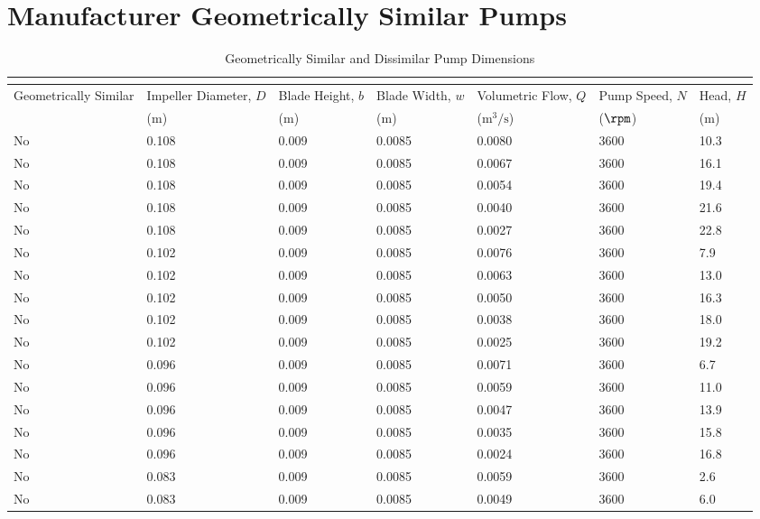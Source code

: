 \section{Manufacturer Geometrically Similar Pumps}
\begin{longtable}{p{}C{0.10\textwidth}C{0.10\textwidth}C{0.10\textwidth}C{0.10\textwidth}C{0.10\textwidth}C{0.10\textwidth}}
    \caption{Geometrically Similar and Dissimilar Pump Dimensions} \\
    \label{tab:geometrically_similar_pumps} \\[-8ex]
    \toprule
    Geometrically Similar & Impeller Diameter, $D$ & Blade Height, $b$ & Blade Width, $w$ & Volumetric Flow, $Q$ & Pump Speed, $N$ & Head, $H$ \\
    & ($\unit{\meter}$) & ($\unit{\meter}$) & ($\unit{\meter}$) & ($\unit{\meter\cubed\per\second}$) & ($\unit{\rpm}$) & ($\unit{\meter}$) \\
    \midrule
    No & 0.108 & 0.009 & 0.0085 & 0.0080 & 3600 & 10.3 \\
    No & 0.108 & 0.009 & 0.0085 & 0.0067 & 3600 & 16.1 \\
    No & 0.108 & 0.009 & 0.0085 & 0.0054 & 3600 & 19.4 \\
    No & 0.108 & 0.009 & 0.0085 & 0.0040 & 3600 & 21.6 \\
    No & 0.108 & 0.009 & 0.0085 & 0.0027 & 3600 & 22.8 \\
    No & 0.102 & 0.009 & 0.0085 & 0.0076 & 3600 & 7.9 \\
    No & 0.102 & 0.009 & 0.0085 & 0.0063 & 3600 & 13.0 \\
    No & 0.102 & 0.009 & 0.0085 & 0.0050 & 3600 & 16.3 \\
    No & 0.102 & 0.009 & 0.0085 & 0.0038 & 3600 & 18.0 \\
    No & 0.102 & 0.009 & 0.0085 & 0.0025 & 3600 & 19.2 \\
    No & 0.096 & 0.009 & 0.0085 & 0.0071 & 3600 & 6.7 \\
    No & 0.096 & 0.009 & 0.0085 & 0.0059 & 3600 & 11.0 \\
    No & 0.096 & 0.009 & 0.0085 & 0.0047 & 3600 & 13.9 \\
    No & 0.096 & 0.009 & 0.0085 & 0.0035 & 3600 & 15.8 \\
    No & 0.096 & 0.009 & 0.0085 & 0.0024 & 3600 & 16.8 \\
    No & 0.083 & 0.009 & 0.0085 & 0.0059 & 3600 & 2.6 \\
    No & 0.083 & 0.009 & 0.0085 & 0.0049 & 3600 & 6.0 \\

\end{longtable}
